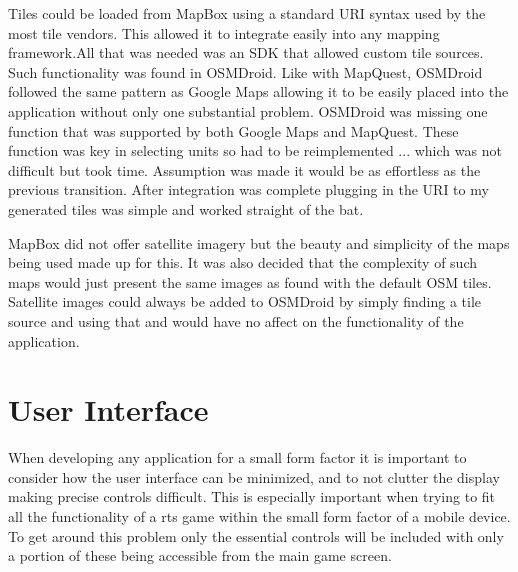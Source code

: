 Tiles could be loaded from MapBox using a standard URI syntax used by the most tile vendors. This allowed it to integrate easily into any mapping framework.All that was needed was an SDK that allowed custom tile sources. Such functionality was found in OSMDroid. Like with MapQuest, OSMDroid followed the same pattern as Google Maps allowing it to be easily placed into the application without only one substantial problem. OSMDroid was missing one function that was supported by both Google Maps and MapQuest. These function was key in selecting units so had to be reimplemented ... which was not difficult but took time. Assumption was made it would be as effortless as the previous transition. After integration was complete plugging in the URI to my generated tiles was simple and worked straight of the bat.

MapBox did not offer satellite imagery but the beauty and simplicity of the maps being used made up for this. It was also decided that the complexity of such maps would just present the same images as found with the default OSM tiles. Satellite images could always be added to OSMDroid by simply finding a tile source and using that and would have no affect on the functionality of the application. 

\section{User Interface}
When developing any application for a small form factor it is important to consider how the user interface can be minimized, and to not clutter the display making precise controls difficult. This is especially important when trying to fit all the functionality of a \gls{rts} game within the small form factor of a mobile device. To get around this problem only the essential controls will be included with only a portion of these being accessible from the main game screen.

